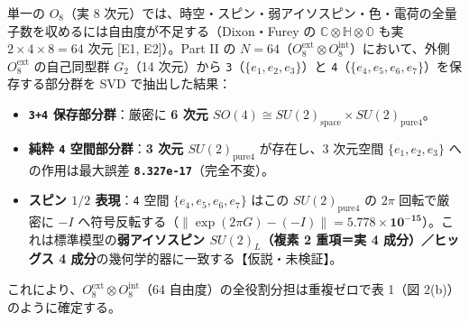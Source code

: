 \documentclass[
  a4paper,
]{ltjsarticle}
\providecommand{\tightlist}{%
  \setlength{\itemsep}{0pt}\setlength{\parskip}{0pt}}
\begin{document}
単一の \(O_8\)（実 8
次元）では、時空・スピン・弱アイソスピン・色・電荷の全量子数を収めるには自由度が不足する（Dixon・Furey
の \(\mathbb{C}\otimes\mathbb{H}\otimes\mathbb{O}\) も実
\(2\times 4\times 8 = 64\) 次元 {[}E1, E2{]}）。Part II の
\(N = 64\)（\(O_8^{\mathrm{ext}} \otimes O_8^{\mathrm{int}}\)）において、外側
\(O_8^{\mathrm{ext}}\) の自己同型群 \(G_2\)（14 次元）から
\texttt{3}（\(\{e_1,e_2,e_3\}\)）と
\texttt{4}（\(\{e_4,e_5,e_6,e_7\}\)）を保存する部分群を SVD
で抽出した結果：

\begin{itemize}
\tightlist
\item
  \textbf{\texttt{3+4} 保存部分群}：厳密に \textbf{6 次元
  \(SO(4) \cong SU(2)_{\mathrm{space}} \times SU(2)_{\mathrm{pure4}}\)}。
\item
  \textbf{純粋 \texttt{4} 空間部分群}：\textbf{3 次元
  \(SU(2)_{\mathrm{pure4}}\)} が存在し、3 次元空間 \(\{e_1,e_2,e_3\}\)
  への作用は最大誤差 \textbf{\texttt{8.327e-17}}（完全不変）。
\item
  \textbf{スピン \(1/2\) 表現}：\texttt{4} 空間 \(\{e_4,e_5,e_6,e_7\}\)
  はこの \(SU(2)_{\mathrm{pure4}}\) の \(2\pi\) 回転で厳密に \(-I\)
  へ符号反転する（\(\|\exp(2\pi G) - (-I)\| = \mathbf{5.778 \times 10^{-15}}\)）。これは標準模型の\textbf{弱アイソスピン
  \(SU(2)_L\)（複素 2 重項＝実 4 成分）／ヒッグス 4
  成分}の幾何学的器に一致する【仮説・未検証】。
\end{itemize}

これにより、\(O_8^{\mathrm{ext}} \otimes O_8^{\mathrm{int}}\)（64
自由度）の全役割分担は重複ゼロで表 1（図 2(b)）のように確定する。
\end{document}
